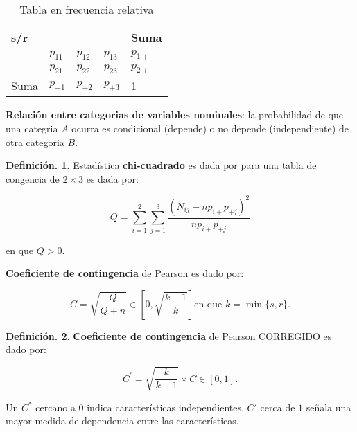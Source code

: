 \documentclass[]{book}
\theoremstyle{definition}
\newtheorem{definition}{Definición.}[chapter]
\theoremstyle{definition}
\theoremstyle{definition}
\theoremstyle{remark}
\begin{document}
\begin{table}[!htbp]
\centering
\caption{Tabla en frecuencia relativa}
\label{m}
\begin{tabular}{|l|l|l|l|l|}
\hline
  s/r&                 &  &  & \mbox{Suma}  \\ \hline
   &        $p_{11}$ & $p_{12}$  & $p_{13}$  &  $p_{1+}$ \\ \hline
 &        $p_{21}$ & $p_{22}$  & $p_{23}$  & $p_{2+}$  \\ \hline
\mbox{Suma} & $p_{+1}$ & $p_{+2}$    & $p_{+3}$  & 1  \\ \hline
\end{tabular}
\end{table}

\textbf{Relación entre categorias de variables nominales}: la probabilidad de que una categria \(A\) ocurra es condicional (depende) o no depende (independiente) de otra categoria \(B\).

\begin{definition}
\protect\hypertarget{def:unnamed-chunk-111}{}{\label{def:unnamed-chunk-111} }Estadística \textbf{chi-cuadrado} es dada por para una tabla de congencia de
\(2\times 3\) es dada por:

\begin{equation*}
 Q= \sum_{i=1}^2 \sum_{j=1}^3 \frac{(N_{ij} - np_{i+}p_{+j})^2
  }{np_{i+}p_{+j} }
\end{equation*}

en que \(Q>0\).

\textbf{Coeficiente de contingencia} de Pearson es dado por:

\begin{equation*}
C= \sqrt{  \frac{Q}{Q+n}}  \in \left[0, \sqrt{\frac{k-1}{k}} \right]
\mbox{en que } k = \min \{s,r \} .
\end{equation*}
\end{definition}

\begin{definition}
\protect\hypertarget{def:unnamed-chunk-112}{}{\label{def:unnamed-chunk-112} }
\textbf{Coeficiente de contingencia} de Pearson CORREGIDO es dado por:

\begin{equation*}
C^{\prime}= \sqrt{\frac{k}{k-1}}\times C \in [0,1].
\end{equation*}

Un \(C^{*}\) cercano a \(0\) indica características independientes. \(C'\)
cerca de \(1\) señala una mayor medida de dependencia entre las
características.
\end{definition}
\end{document}
